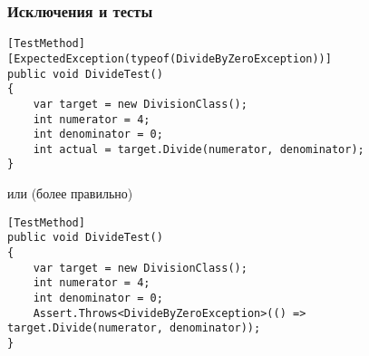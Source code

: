 \documentclass[xetex,mathserif,serif]{beamer}
\begin{document}
    \begin{frame}[fragile]
        \frametitle{Исключения и тесты}
        \begin{footnotesize}
            \begin{verbatim}
[TestMethod]
[ExpectedException(typeof(DivideByZeroException))]
public void DivideTest()
{
    var target = new DivisionClass();
    int numerator = 4;
    int denominator = 0;
    int actual = target.Divide(numerator, denominator);
}
            \end{verbatim}
        \end{footnotesize}
        или (более правильно)
        \begin{footnotesize}
            \begin{verbatim}
[TestMethod]
public void DivideTest()
{
    var target = new DivisionClass();
    int numerator = 4;
    int denominator = 0;
    Assert.Throws<DivideByZeroException>(() => target.Divide(numerator, denominator));
}
            \end{verbatim}
        \end{footnotesize}
    \end{frame}
\end{document}
